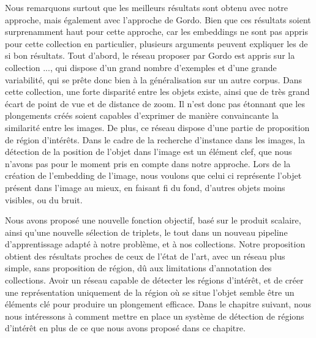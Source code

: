 Nous remarquons surtout que les meilleurs résultats sont obtenu avec notre approche, mais également avec l'approche de Gordo. Bien que ces résultats soient surprenamment haut pour cette approche, car les embeddings ne sont pas appris pour cette collection en particulier, plusieurs arguments peuvent expliquer les de si bon résultats. 
Tout d'abord, le réseau proposer par Gordo est appris sur la collection ..., qui dispose d'un grand nombre d'exemples et d'une grande variabilité, qui se prête donc bien à la généralisation sur un autre corpus. 
Dans cette collection, une forte disparité entre les objets existe, ainsi que de très grand écart de point de vue et de distance de zoom. 
Il n'est donc pas étonnant que les plongements créés soient capables d'exprimer de manière convaincante la similarité entre les images. 
De plus, ce réseau dispose d'une partie de proposition de région d'intérêts. 
Dans le cadre de la recherche d'instance dans les images, la détection de la position de l'objet dans l'image est un élément clef, que nous n'avons pas pour le moment pris en compte dans notre approche. 
Lors de la création de l'embedding de l'image, nous voulons que celui ci représente l'objet présent dans l'image au mieux, en faisant fi du fond, d'autres objets moins visibles, ou du bruit. 

Nous avons proposé une nouvelle fonction objectif, basé sur le produit scalaire, ainsi qu'une nouvelle sélection de triplets, le tout dans un nouveau pipeline d'apprentissage adapté à notre problème, et à nos collections.
Notre proposition obtient des résultats proches de ceux de l'état de l'art, avec un réseau plus simple, sans proposition de région, dû aux limitations d’annotation des collections.
Avoir un réseau capable de détecter les régions d'intérêt, et de créer une représentation uniquement de la région où se situe l'objet semble être un éléments clé pour produire un plongement efficace. 
Dans le chapitre suivant, nous nous intéressons à comment mettre en place un système de détection de régions d'intérêt en plus de ce que nous avons proposé dans ce chapitre.
